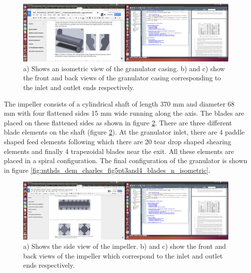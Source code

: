 \documentclass[preprint,11pt,authoryear]{elsarticle}
\begin{document}
	      \begin{figure}[H]
	      \centering
	      \includegraphics[scale=0.1]{mthds_dem_charles_fig5pt01_gran_shell}
	      \caption{ a) Shows an isometric view of the granulator casing. b) and c) show the front and back views of the granulator casing corresponding to the inlet and outlet ends respectively.}
	      \label{fig:mthdsDemCharlesGranShell}
	      \end{figure}
	   
	    \par  The impeller consists of a cylindrical shaft of length 370 mm and diameter 68 mm with four flattened sides 15 mm wide running along the axis. The blades are placed on these flattened sides as shown in figure \ref{fig:mthds_dem_charles_impeller}. There are three different blade elements on the shaft (figure \ref{fig:mthds_dem_charles_impeller}). At the granulator inlet, there are 4 paddle shaped feed elements following which there are 20 tear drop shaped shearing elements  and finally 4 trapezoidal blades near the exit. All these elements are placed in a spiral configuration. The final configuration of the granulator is shown in figure \ref{fig:mthds_dem_charles_fig5pt3and4_blades_n_isometric}.
	
	      \begin{figure}[H]
	      \centering
	      \includegraphics[scale=0.1]{mthds_dem_charles_fig5pt2_impeller}
	      \caption{a) Shows the side view of the impeller. b) and c) show the front and back views of the impeller which correspond to the inlet and outlet ends respectively.}
	      \label{fig:mthds_dem_charles_impeller}
	      \end{figure}    
	    
\end{document}
